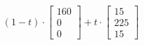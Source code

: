 \documentclass[preview]{standalone}
\begin{document}
\begin{align*}
(1- t ) \cdot \begin{bmatrix} 160 \\ 0 \\ 0 \end{bmatrix} + t \cdot \begin{bmatrix} 15 \\ 225 \\ 15 \end{bmatrix}
\end{align*}
\end{document}
